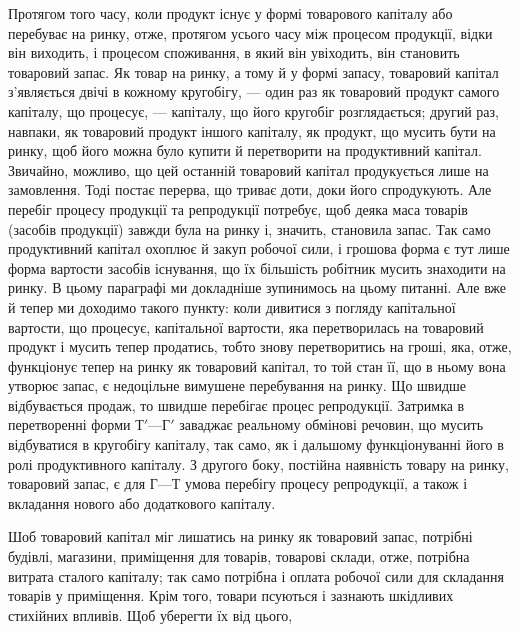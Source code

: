 Протягом того часу, коли продукт існує у формі товарового капіталу
або перебуває на ринку, отже, протягом усього часу між процесом
продукції, відки він виходить, і процесом споживання, в який він увіходить,
він становить товаровий запас. Як товар на ринку, а тому й у формі
запасу, товаровий капітал з’являється двічі в кожному кругобігу, — один
раз як товаровий продукт самого капіталу, що процесує, — капіталу, що
його кругобіг розглядається; другий раз, навпаки, як товаровий продукт
іншого капіталу, як продукт, що мусить бути на ринку, щоб його
можна було купити й перетворити на продуктивний капітал. Звичайно,
можливо, що цей останній товаровий капітал продукується лише на
замовлення. Тоді постає перерва, що триває доти, доки його спродукують.
Але перебіг процесу продукції та репродукції потребує, щоб деяка маса
товарів (засобів продукції) завжди була на ринку і, значить, становила запас.
Так само продуктивний капітал охоплює й закуп робочої сили, і грошова
форма є тут лише форма вартости засобів існування, що їх більшість робітник
мусить знаходити на ринку. В цьому параграфі ми докладніше зупинимось
на цьому питанні. Але вже й тепер ми доходимо такого пункту:
коли дивитися з погляду капітальної вартости, що процесує, капітальної
вартости, яка перетворилась на товаровий продукт і мусить тепер продатись,
тобто знову перетворитись на гроші, яка, отже, функціонує тепер на ринку
як товаровий капітал, то той стан її, що в ньому вона утворює запас, є
недоцільне вимушене перебування на ринку. Що швидше відбувається
продаж, то швидше перебігає процес репродукції. Затримка в
перетворенні форми $Т' — Г'$ заваджає реальному обмінові речовин, що
мусить відбуватися в кругобігу капіталу, так само, як і дальшому функціонуванні
його в ролі продуктивного капіталу. З другого боку, постійна
наявність товару на ринку, товаровий запас, є для $Г — Т$ умова перебігу
процесу репродукції, а також і вкладання нового або додаткового
капіталу.

Шоб товаровий капітал міг лишатись на ринку як товаровий запас,
потрібні будівлі, магазини, приміщення для товарів, товарові склади, отже,
потрібна витрата сталого капіталу; так само потрібна і оплата робочої
сили для складання товарів у приміщення. Крім того, товари псуються
і зазнають шкідливих стихійних впливів. Щоб уберегти їх від цього,
\parbreak{}  %

